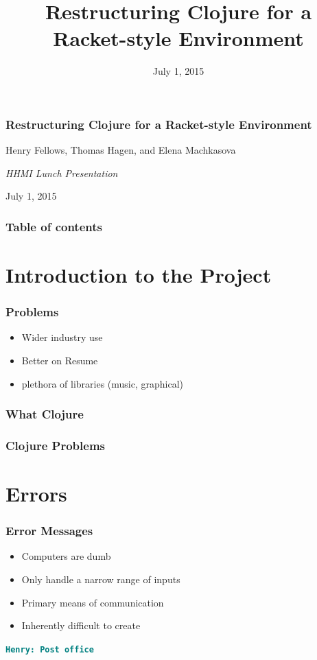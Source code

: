 \documentclass{beamer}
\newcommand{\comment}[1]{{\bf \tt  {#1}}}
\newcommand{\hfcomment}[1]{\textcolor{Teal}{\comment{Henry: {#1}}}}
\begin{document}
\title{Restructuring Clojure for a Racket-style Environment}
\date{July 1, 2015}

\begin{frame}
\frametitle {Restructuring Clojure for a Racket-style Environment}
{\centering
\noindent
Henry Fellows, Thomas Hagen, and Elena Machkasova \par

{\it 
HHMI Lunch Presentation\par
July 1, 2015\par}
}
\end{frame}

\begin{frame}
\frametitle{Table of contents}
\tableofcontents  
\end{frame}

\section{Introduction to the Project}

\begin{frame}
	\frametitle{Problems}
\end{frame}

\begin{frame}
	\begin{itemize}
		\frametitle{Why Clojure}
		\item Wider industry use
		\item Better on Resume
		\item plethora of libraries (music, graphical)
	\end{itemize}
\end{frame}

\begin{frame}
	\frametitle{What Clojure}
\end{frame}

\begin{frame}
	\frametitle{Clojure Problems}
\end{frame}



\section{Errors}

\begin{frame}
	\frametitle{Error Messages}
	\begin{itemize}
		\item Computers are dumb
		\item Only handle a narrow range of inputs
		\item Primary means of communication
		\item Inherently difficult to create
	\end{itemize}
	\hfcomment{Post office}
\end{frame}
\end{document}
